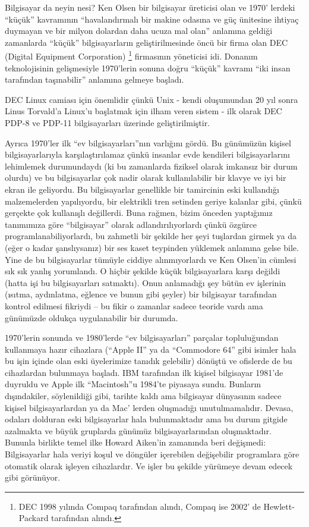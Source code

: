 \begin{section}{Bilgisayar da neyin nesi?}
Ken Olsen bir bilgisayar üreticisi olan ve 1970' lerdeki “küçük” kavramının “havalandırmalı bir makine odasına ve güç ünitesine ihtiyaç duymayan ve bir milyon dolardan daha ucuza mal olan” anlamına geldiği zamanlarda “küçük” bilgisayarların geliştirilmesinde öncü bir firma olan  DEC (Digital Equipment Corporation) \footnote{DEC 1998 yılında Compaq tarafından alındı, Compaq ise 2002' de Hewlett-Packard tarafından alındı.} firmasının yöneticisi idi. Donanım teknolojisinin gelişmesiyle 1970'lerin sonuna doğru “küçük” kavramı “iki insan tarafından taşınabilir” anlamına gelmeye başladı.

DEC Linux camiası için önemlidir çünkü Unix - kendi oluşumundan 20 yıl sonra Linus Torvald'a Linux'u başlatmak için ilham veren sistem - ilk olarak DEC PDP-8 ve PDP-11 bilgisayarları üzerinde geliştirilmiştir.

Ayrıca 1970'ler ilk “ev bilgisayarları”nın varlığını gördü. Bu günümüzün kişisel bilgisayarlarıyla karşılaştırılamaz çünkü insanlar evde kendileri bilgisayarlarını lehimlemek durumundaydı (ki bu zamanlarda fiziksel olarak imkansız bir durum olurdu) ve bu bilgisayarlar çok nadir olarak kullanılabilir bir klavye ve iyi bir ekran ile geliyordu. Bu bilgisayarlar genellikle bir tamircinin eski kullandığı malzemelerden yapılıyordu, bir elektrikli tren setinden geriye kalanlar gibi, çünkü gerçekte çok kullanışlı değillerdi. Buna rağmen, bizim önceden yaptığımız tanımımıza göre “bilgisayar” olarak adlandırılıyorlardı çünkü özgürce programlanabiliyorlardı, bu zahmetli bir şekilde her şeyi tuşlardan girmek ya da (eğer o kadar şanslıysanız) bir ses kaset teypinden yüklemek anlamına gelse bile. Yine de bu bilgisayarlar tümüyle ciddiye alınmıyorlardı ve Ken Olsen'in cümlesi sık sık yanlış yorumlandı. O hiçbir şekilde küçük bilgisayarlara karşı değildi (hatta işi bu bilgisayarları satmaktı). Onun anlamadığı şey bütün ev işlerinin (ısıtma, aydınlatma, eğlence ve bunun gibi şeyler) bir bilgisayar tarafından kontrol edilmesi fikriydi – bu fikir o zamanlar sadece teoride vardı ama günümüzde oldukça uygulanabilir bir durumda.

1970'lerin  sonunda ve 1980'lerde “ev bilgisayarları” parçalar topluluğundan kullanmaya hazır  cihazlara (“Apple II” ya da “Commodore 64” gibi isimler hala bu işin içinde olan eski üyelerimize tanıdık gelebilir) dönüştü ve ofislerde de bu cihazlardan bulunmaya başladı. IBM tarafından ilk kişisel bilgisayar 1981'de duyruldu ve Apple ilk “Macintosh”u 1984'te piyasaya sundu. Bunların dışındakiler, söylenildiği gibi, tarihte kaldı ama bilgisayar dünyasının sadece kişisel bilgisayarlardan ya da Mac' lerden oluşmadığı unutulmamalıdır.  Devasa, odaları dolduran eski bilgisayarlar hala bulunmaktadır ama bu durum gitgide azalmakta ve büyük gruplarda günümüz bilgisayarlarından oluşmaktadır. Bununla birlikte temel ilke Howard Aiken'in zamanında beri değişmedi: Bilgisayarlar hala veriyi koşul ve döngüler içerebilen değişebilir programlara göre otomatik olarak işleyen cihazlardır. Ve işler bu şekilde yürümeye devam edecek gibi görünüyor. 


\end{section}
